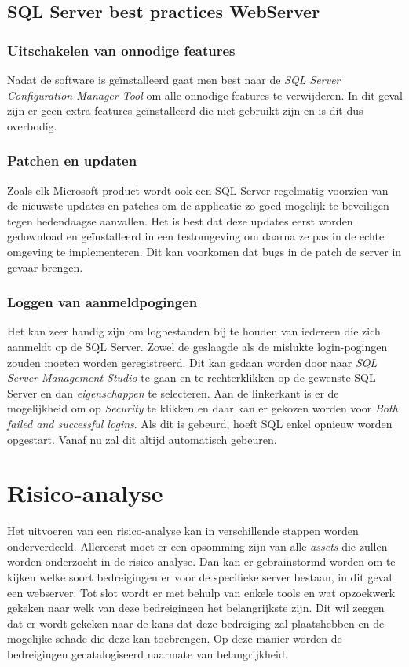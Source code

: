 \documentclass[pdftex,a4paper,12pt]{report}
\begin{document}
\section{SQL Server best practices WebServer}
\subsection{Uitschakelen van onnodige features}
Nadat de software is geïnstalleerd gaat men best naar de \textit{SQL Server Configuration Manager Tool} om alle onnodige features te verwijderen. In dit geval zijn er geen extra features geïnstalleerd die niet gebruikt zijn en is dit dus overbodig. \citep{Mam2013}

\subsection{Patchen en updaten}
Zoals elk Microsoft-product wordt ook een SQL Server regelmatig voorzien van de nieuwste updates en patches om de applicatie zo goed mogelijk te beveiligen tegen hedendaagse aanvallen. Het is best dat deze updates eerst worden gedownload en geïnstalleerd in een testomgeving om daarna ze pas in de echte omgeving te implementeren. Dit kan voorkomen dat bugs in de patch de server in gevaar brengen. \citep{Mam2013}

\subsection{Loggen van aanmeldpogingen}
Het kan zeer handig zijn om logbestanden bij te houden van iedereen die zich aanmeldt op de SQL Server. Zowel de geslaagde als de mislukte login-pogingen zouden moeten worden geregistreerd. Dit kan gedaan worden door naar \textit{SQL Server Management Studio} te gaan en te rechterklikken op de gewenste SQL Server en dan \textit{eigenschappen} te selecteren. Aan de linkerkant is er de mogelijkheid om op \textit{Security} te klikken en daar kan er gekozen worden voor \textit{Both failed and successful logins}. Als dit is gebeurd, hoeft SQL enkel opnieuw worden opgestart. Vanaf nu zal dit altijd automatisch gebeuren. \citep{Mam2013}

\chapter{Risico-analyse}
Het uitvoeren van een risico-analyse kan in verschillende stappen worden onderverdeeld. Allereerst moet er een opsomming zijn van alle \textit{assets} die zullen worden onderzocht in de risico-analyse. Dan kan er gebrainstormd worden om te kijken welke soort bedreigingen er voor de specifieke server bestaan, in dit geval een webserver. Tot slot wordt er met behulp van enkele tools en wat opzoekwerk gekeken naar welk van deze bedreigingen het belangrijkste zijn. Dit wil zeggen dat er wordt gekeken naar de kans dat deze bedreiging zal plaatshebben en de mogelijke schade die deze kan toebrengen. Op deze manier worden de bedreigingen gecatalogiseerd naarmate van belangrijkheid.
\end{document}
